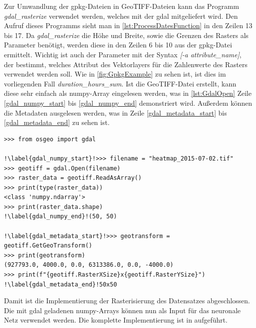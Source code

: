 Zur Umwandlung der \acrshort{gpkg}-Dateien in GeoTIFF-Dateien kann das Programm \emph{gdal\_rasterize} verwendet werden, welches mit der \acrfull{gdal} mitgeliefert wird.
Den Aufruf dieses Programms sieht man in \autoref{lst:ProcessDatesFunction} in den Zeilen 13 bis 17.
Da \emph{gdal\_rasterize} die Höhe und Breite, sowie die Grenzen des Rasters als Parameter benötigt, werden diese in den Zeilen 6 bis 10 aus der \acrshort{gpkg}-Datei ermittelt.
Wichtig ist auch der Parameter mit der Syntax \emph{[-a attribute\_name]}, der bestimmt, welches Attribut des Vektorlayers für die Zahlenwerte des Rasters verwendet werden soll.
Wie in \autoref{fig:GpkgExample} zu sehen ist, ist dies im vorliegenden Fall \emph{duration\_hours\_sum}.
Ist die GeoTIFF-Datei erstellt, kann diese sehr einfach als numpy-Array eingelesen werden, was in \autoref{lst:GdalOpen} Zeile \ref{gdal_numpy_start} bis \ref{gdal_numpy_end} demonstriert wird.
Außerdem können die Metadaten ausgelesen werden, was in Zeile \ref{gdal_metadata_start} bis \ref{gdal_metadata_end} zu sehen ist.

\begin{minipage}{\textwidth}
\begin{code}
\begin{verbatim}
>>> from osgeo import gdal

!\label{gdal_numpy_start}!>>> filename = "heatmap_2015-07-02.tif"
>>> geotiff = gdal.Open(filename)
>>> raster_data = geotiff.ReadAsArray()
>>> print(type(raster_data))
<class 'numpy.ndarray'>
>>> print(raster_data.shape)
!\label{gdal_numpy_end}!(50, 50)

!\label{gdal_metadata_start}!>>> geotransform = geotiff.GetGeoTransform()
>>> print(geotransform)
(927793.0, 4000.0, 0.0, 6313386.0, 0.0, -4000.0)
>>> print(f"{geotiff.RasterXSize}x{geotiff.RasterYSize}")
!\label{gdal_metadata_end}!50x50
\end{verbatim}
\label{lst:GdalOpen}
\end{code}
\end{minipage}

Damit ist die Implementierung der Rasterisierung des Datensatzes abgeschlossen.
Die mit \acrshort{gdal} geladenen numpy-Arrays können nun als Input für das neuronale Netz verwendet werden.
Die komplette Implementierung ist in  aufgeführt.
